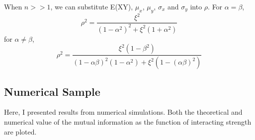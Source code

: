 \documentclass{article}
\begin{document}
		When $n >> 1$, we can substitute E(XY), $\mu_x$, $\mu_y$, $\sigma_x$ and $\sigma_y$ into $\rho$. For $\alpha = \beta$,
		\begin{equation}
			\rho^2 = \frac{\xi^2}{(1-\alpha^2)^2 + \xi^2(1+\alpha^2)}
		\end{equation}
		for $\alpha\neq\beta$,
		\begin{equation}
			\rho^2 = \frac{\xi^2(1-\beta^2)}{(1-\alpha\beta)^2(1-\alpha^2) + \xi^2(1-(\alpha\beta)^2)}
		\end{equation}

		\subsection{Numerical Sample}
		Here, I presented results from numerical simulations. Both the theoretical and numerical value of the mutual information as the function of interacting strength are ploted.
\end{document}
